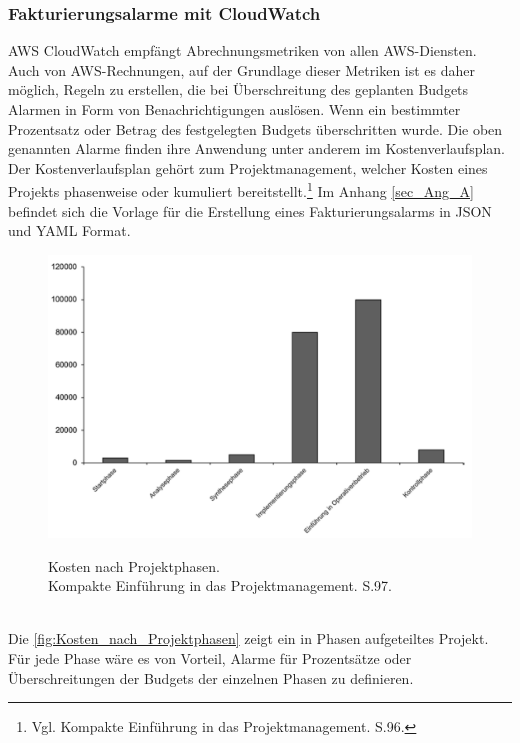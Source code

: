 \subsubsection*{Fakturierungsalarme mit CloudWatch}
AWS CloudWatch empfängt Abrechnungsmetriken von allen AWS-Diensten. Auch von AWS-Rechnungen, auf der Grundlage dieser Metriken ist es daher möglich, Regeln zu erstellen, die bei Überschreitung des geplanten Budgets Alarmen in Form von Benachrichtigungen auslösen.
Wenn ein bestimmter Prozentsatz oder Betrag des festgelegten Budgets überschritten wurde. Die oben genannten Alarme finden ihre Anwendung unter anderem im Kostenverlaufsplan. Der Kostenverlaufsplan gehört zum Projektmanagement, welcher Kosten eines Projekts phasenweise oder kumuliert bereitstellt.\footnote{Vgl. Kompakte Einführung in das Projektmanagement. S.96\cite{PM1}.} Im Anhang \ref{sec_Ang_A} befindet sich die Vorlage für die Erstellung eines Fakturierungsalarms in JSON und YAML Format.
\begin{figure}[h!]
  \centering
  \includegraphics[scale=0.5]{sources/Kosten_nach_Projektphasen}
  \caption[Kosten nach Projektphasen]{}
  \label{fig:Kosten_nach_Projektphasen} 
  Kosten nach Projektphasen.\\
  Kompakte Einführung in das Projektmanagement. S.97\cite{PM1}.
\end{figure}
\\
Die \autoref{fig:Kosten_nach_Projektphasen} zeigt ein in Phasen aufgeteiltes Projekt. Für jede Phase wäre es von Vorteil, Alarme für Prozentsätze oder Überschreitungen der Budgets der einzelnen Phasen zu definieren.
